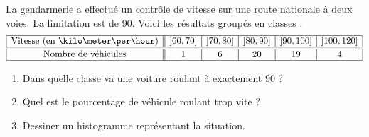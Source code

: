 
\begin{exercice}\label{exosmath-0533}

    La gendarmerie a effectué un contrôle de vitesse sur une route nationale à deux voies. La limitation est de \unit{90}{\kilo\meter\per\hour}. Voici les résultats groupés en classes :
    \begin{equation*}
        \begin{array}[]{|c||c|c|c|c|c|}
            \hline
            \text{Vitesse (en \kilo\meter\per\hour)}&\mathopen] 60 , 70 \mathclose]&\mathopen] 70 , 80 \mathclose]&\mathopen] 80 , 90 \mathclose]&\mathopen] 90 , 100 \mathclose]&\mathopen] 100 , 120 \mathclose]\\
              \hline\hline
              \text{Nombre de véhicules}&1&6&20&19&4\\ 
              \hline 
               \end{array}
    \end{equation*}
    \begin{enumerate}
        \item
            Dans quelle classe va une voiture roulant à exactement \unit{90}{\kilo\meter\per\hour} ?
        \item
            Quel est le pourcentage de véhicule roulant trop vite ?
        \item
            Dessiner un histogramme représentant la situation.
    \end{enumerate}

\end{exercice}
